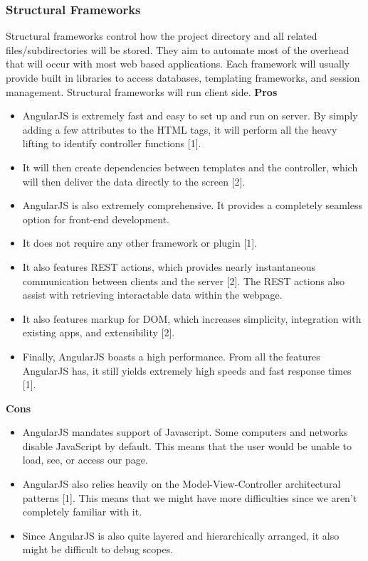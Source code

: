 \subsubsection{Structural Frameworks}
	Structural frameworks control how the project directory and all related files/subdirectories will be stored. They aim to automate most of the overhead that will occur with most web based applications. Each framework will usually provide built in libraries to access databases, templating frameworks, and session management. Structural frameworks will run client side.
	\textbf{Pros}
		\begin{itemize}
			\item AngularJS is extremely fast and easy to set up and run on server. By simply adding a few attributes to the HTML tags, it will perform all the heavy lifting to identify controller functions [1]. 
			\item It will then create dependencies between templates and the controller, which will then deliver the data directly to the screen [2]. 
			\item AngularJS is also extremely comprehensive. It provides a completely seamless option for front-end development. 
			\item It does not require any other framework or plugin [1]. 
			\item It also features REST actions, which provides nearly instantaneous communication between clients and the server [2]. The REST actions also assist with retrieving interactable data within the webpage. 
			\item It also features markup for DOM, which increases simplicity, integration with existing apps, and extensibility [2]. 
			\item Finally, AngularJS boasts a high performance. From all the features AngularJS has, it still yields extremely high speeds and fast response times [1].
		\end{itemize}
  \textbf{Cons}
		\begin{itemize}
			\item AngularJS mandates support of Javascript. Some computers and networks disable JavaScript by default. This means that the user would be unable to load, see, or access our page. 
			\item AngularJS also relies heavily on the Model-View-Controller architectural patterns [1]. This means that we might have more difficulties since we aren't completely familiar with it. 
			\item Since AngularJS is also quite layered and hierarchically arranged, it also might be difficult to debug scopes.
		\end{itemize}
